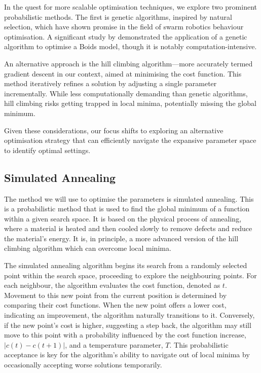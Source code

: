 \documentclass[12pt]{article}
\begin{document}
In the quest for more scalable optimisation techniques, we explore two prominent probabilistic methods. The first is genetic algorithms, inspired by natural selection, which have shown promise in the field of swarm robotics behaviour optimisation. A significant study by \citet{Alaliyat2014OptimisationOB} demonstrated the application of a genetic algorithm to optimise a Boids model, though it is notably computation-intensive.

An alternative approach is the hill climbing algorithm—more accurately termed gradient descent in our context, aimed at minimising the cost function. This method iteratively refines a solution by adjusting a single parameter incrementally. While less computationally demanding than genetic algorithms, hill climbing risks getting trapped in local minima, potentially missing the global minimum.

Given these considerations, our focus shifts to exploring an alternative optimisation strategy that can efficiently navigate the expansive parameter space to identify optimal settings.

\subsection{Simulated Annealing}
\label{sec:simulated-annealing}
The method we will use to optimise the parameters is simulated annealing. This is a probabilistic method that is used to find the global minimum of a function within a given search space. It is based on the physical process of annealing, where a material is heated and then cooled slowly to remove defects and reduce the material's energy. It is, in principle, a more advanced version of the hill climbing algorithm which can overcome local minima.

The simulated annealing algorithm begins its search from a randomly selected point within the search space, proceeding to explore the neighbouring points. For each neighbour, the algorithm evaluates the cost function, denoted as \(t\). Movement to this new point from the current position is determined by comparing their cost functions. When the new point offers a lower cost, indicating an improvement, the algorithm naturally transitions to it. Conversely, if the new point's cost is higher, suggesting a step back, the algorithm may still move to this point with a probability influenced by the cost function increase, \(|c(t) - c(t+1)|\), and a temperature parameter, \(T\). This probabilistic acceptance is key for the algorithm's ability to navigate out of local minima by occasionally accepting worse solutions temporarily.
\end{document}
